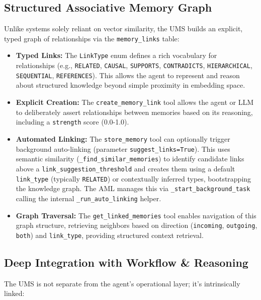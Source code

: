 \documentclass[12pt,a4paper]{article}
\newcommand{\code}[1]{\nolinkurl{#1}}
\begin{document}
\subsection{Structured Associative Memory Graph}

Unlike systems solely reliant on vector similarity, the UMS builds an explicit, typed graph of relationships via the \code{memory\_links} table:

\begin{itemize}
    \item \textbf{Typed Links:} The \code{LinkType} enum defines a rich vocabulary for relationships (e.g., \code{RELATED}, \code{CAUSAL}, \code{SUPPORTS}, \code{CONTRADICTS}, \code{HIERARCHICAL}, \code{SEQUENTIAL}, \code{REFERENCES}). This allows the agent to represent and reason about structured knowledge beyond simple proximity in embedding space.

    \item \textbf{Explicit Creation:} The \code{create\_memory\_link} tool allows the agent or LLM to deliberately assert relationships between memories based on its reasoning, including a \code{strength} score (0.0-1.0).

    \item \textbf{Automated Linking:} The \code{store\_memory} tool can optionally trigger background auto-linking (parameter \code{suggest\_links=True}). This uses semantic similarity (\code{\_find\_similar\_memories}) to identify candidate links above a \code{link\_suggestion\_threshold} and creates them using a default \code{link\_type} (typically \code{RELATED}) or contextually inferred types, bootstrapping the knowledge graph. The AML manages this via \code{\_start\_background\_task} calling the internal \code{\_run\_auto\_linking} helper.

    \item \textbf{Graph Traversal:} The \code{get\_linked\_memories} tool enables navigation of this graph structure, retrieving neighbors based on direction (\code{incoming}, \code{outgoing}, \code{both}) and \code{link\_type}, providing structured context retrieval.
\end{itemize}

\subsection{Deep Integration with Workflow \& Reasoning}

The UMS is not separate from the agent's operational layer; it's intrinsically linked:
\end{document}
